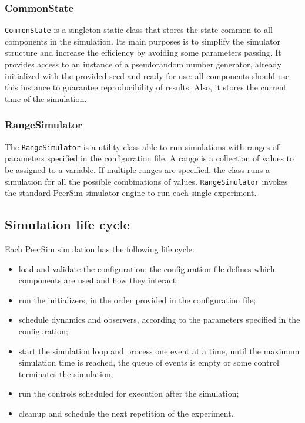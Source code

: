 \subsubsection{CommonState}
\texttt{CommonState} is a singleton static class that stores the state common to all components in the simulation.
Its main purposes is to simplify the simulator structure and increase the efficiency by avoiding some parameters passing.
It provides access to an instance of a pseudorandom number generator, already initialized with the provided seed and ready for use:
all components should use this instance to guarantee reproducibility of results.
Also, it stores the current time of the simulation.

\subsubsection{RangeSimulator}
The \texttt{RangeSimulator} is a utility class able to run simulations with ranges of parameters specified in the configuration file.
A range is a collection of values to be assigned to a variable.
If multiple ranges are specified, the class runs a simulation for all the possible combinations of values.
\texttt{RangeSimulator} invokes the standard PeerSim simulator engine to run each single experiment.

\subsection{Simulation life cycle}
Each PeerSim simulation has the following life cycle:
\begin{itemize}
	\item load and validate the configuration; the configuration file defines which components are used and how they interact;
	\item run the initializers, in the order provided in the configuration file;
	\item schedule dynamics and observers, according to the parameters specified in the configuration;
	\item start the simulation loop and process one event at a time, until the maximum simulation time is reached, the queue of events is empty or some control terminates the simulation;
	\item run the controls scheduled for execution after the simulation;
	\item cleanup and schedule the next repetition of the experiment.
\end{itemize}


